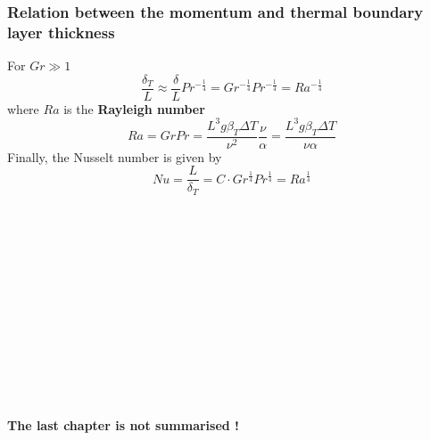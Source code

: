 	\subsubsection{Relation between the momentum and thermal boundary layer thickness}
	For $Gr \gg 1$
	\begin{equation}
		\frac{\delta _T}{L} \approx \frac{\delta }{L}Pr ^{-\frac{1}{4}} = Gr ^{-\frac{1}{4}}Pr ^{-\frac{1}{4}} = Ra ^{-\frac{1}{4}}
	\end{equation}
	where $Ra$ is the \textbf{Rayleigh number} 
	\begin{equation}
		Ra = GrPr = \frac{L^3 g \beta _T \Delta T}{\nu ^2}\frac{ \nu }{\alpha} = \frac{L^3 g \beta _T \Delta T}{\nu \alpha}
	\end{equation}
	Finally, the Nusselt number is given by
	\begin{equation}
		Nu = \frac{L}{\delta _T} =C \cdot Gr ^{\frac{1}{4}}Pr ^{\frac{1}{4}} = Ra ^{\frac{1}{4}}
	\end{equation}
	\\\\\\\\\\\\\\\\\\\\\\\
	\begin{center}
	\textbf{The last chapter is not summarised !}
	\end{center}
